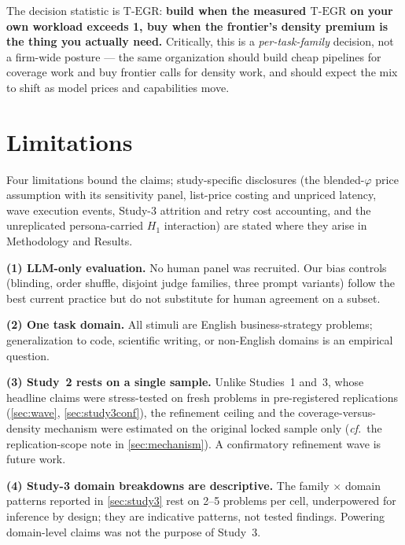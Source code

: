 \documentclass[12pt,a4paper]{article}
\newcommand{\phiBlend}{\varphi}
\newcommand{\TEGR}{\ensuremath{\text{T-EGR}}}
\begin{document}
The decision statistic is $\TEGR$: \textbf{build when the measured $\TEGR$ on your
own workload exceeds 1, buy when the frontier's density premium is the thing you
actually need.} Critically, this is a \emph{per-task-family} decision, not a
firm-wide posture --- the same organization should build cheap pipelines for
coverage work and buy frontier calls for density work, and should expect the mix
to shift as model prices and capabilities move.

\section{Limitations}\label{sec:limitations}

Four limitations bound the claims; study-specific disclosures (the blended-$\phiBlend$
price assumption with its sensitivity panel, list-price costing and unpriced
latency, wave execution events, Study-3 attrition and retry cost accounting, and
the unreplicated persona-carried $H_1$ interaction) are stated where they arise
in Methodology and Results.

\textbf{(1) LLM-only evaluation.} No
human panel was recruited. Our bias controls (blinding, order shuffle, disjoint
judge families, three prompt variants) follow the best current practice
\citep{ZhengEtAl2023, VergaEtAl2024} but do not substitute for human agreement
on a subset.

\textbf{(2) One task domain.} All stimuli are English business-strategy
problems; generalization to code, scientific writing,
or non-English domains is an empirical question.

\textbf{(3) Study~2 rests on a single sample.} Unlike Studies~1 and~3, whose
headline claims were stress-tested on fresh problems in pre-registered
replications (\cref{sec:wave}, \cref{sec:study3conf}), the refinement ceiling
and the coverage-versus-density mechanism were estimated on the original locked
sample only (\emph{cf.}\ the replication-scope note in \cref{sec:mechanism}).
A confirmatory refinement wave is future work.

\textbf{(4) Study-3 domain breakdowns are descriptive.} The family $\times$
domain patterns reported in \cref{sec:study3} rest on 2--5 problems per cell,
underpowered for inference by design; they are indicative patterns, not tested
findings. Powering domain-level claims was not the purpose of Study~3.
\end{document}
